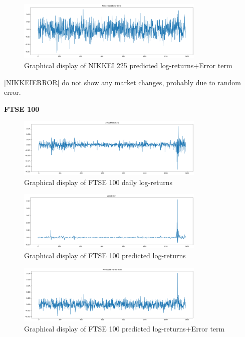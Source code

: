 \documentclass[a4paper,11pt,oneside]{book}
\begin{document}
\begin{figure}[!h]
	\centering
	\includegraphics[width=0.8\textwidth]{figures/NIKKEIERROR}
	\caption{Graphical display of NIKKEI 225 predicted log-returns+Error term}
	\label{NIKKEIERROR}
\end{figure}
\autoref{NIKKEIERROR} do not show any market changes, probably due to random error.

\vfill


\textbf{FTSE 100}
\begin{figure}[!h]
	\centering
	\includegraphics[width=0.8\textwidth]{figures/FTSETEST}
	\caption{Graphical display of FTSE 100 daily log-returns}
	\label{FTSETEST}
\end{figure}

\begin{figure}[!h]
	\centering
	\includegraphics[width=0.8\textwidth]{figures/FTSEPRED}
	\caption{Graphical display of FTSE 100 predicted log-returns}
	\label{FTSEPRED}
\end{figure}


\begin{figure}[!h]
	\centering
	\includegraphics[width=0.8\textwidth]{figures/FTSEERROR}
	\caption{Graphical display of FTSE 100 predicted log-returns+Error term}
	\label{FTSEERROR}
\end{figure}
\newpage
\end{document}
